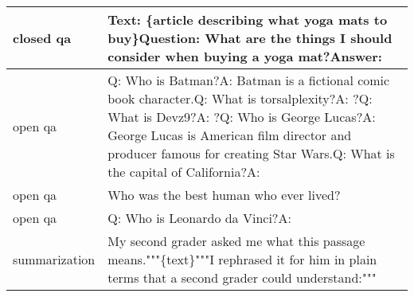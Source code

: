 \begin{longtable}{p{} p{}}
     closed qa &                                                                                                                                                        Text: {\newline}\{article describing what yoga mats to buy\}{\newline}{\newline}Question: What are the things I should consider when buying a yoga mat?{\newline}Answer:  \\ \midrule
       open qa & Q: Who is Batman?{\newline}A: Batman is a fictional comic book character.{\newline}{\newline}Q: What is torsalplexity?{\newline}A: ?{\newline}{\newline}Q: What is Devz9?{\newline}A: ?{\newline}{\newline}Q: Who is George Lucas?{\newline}A: George Lucas is American film director and producer famous for creating Star Wars.{\newline}{\newline}Q: What is the capital of California?{\newline}A: \\ \midrule
       open qa &                                                                                                                                                                                                                                                         Who was the best human who ever lived? \\ \midrule
       open qa &                                                                                                                                                                                                                                                               Q: Who is Leonardo da Vinci?{\newline}A: \\ \midrule
 summarization &                                                                                                                                        My second grader asked me what this passage means.{\newline}"""{\newline}\{text\}{\newline}"""{\newline}I rephrased it for him in plain terms that a second grader could understand:{\newline}""" \\ \midrule

\end{longtable}
